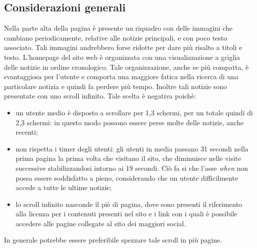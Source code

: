 \documentclass[../ProgettoTecWeb2.tex]{subfiles}
\begin{document}
	\subsection{Considerazioni generali}
		Nella parte alta della pagina è presente un riquadro con delle immagini che cambiano periodicamente, relative alle notizie principali, e con poco testo associato. Tali immagini andrebbero forse ridotte per dare più risalto a titoli e testo.
		L'homepage del sito web è organizzata con una visualizzazione a griglia delle notizie in ordine cronologico. Tale organizzazione, anche se più compatta, è svantaggiosa per l'utente e comporta una maggiore fatica nella ricerca di una particolare notizia e quindi fa perdere più tempo.
		Inoltre tali notizie sono presentate con uno scroll infinito. Tale scelta è negativa poichè:
		\begin{itemize}
			\item un utente medio è disposto a scrollare per 1,3 schermi, per un totale quindi di 2,3 schermi: in questo modo possono essere perse molte delle notizie, anche recenti;
			\item non rispetta i timer degli utenti: gli utenti in media passano 31 secondi nella prima pagina la prima volta che visitano il sito, che diminuisce nelle visite successive stabilizzandosi intorno ai 19 secondi. Ciò fa si che l'asse \textit{when} non possa essere soddisfatto a pieno, considerando che un utente difficilmente accede a tutte le ultime notizie;
			\item lo scroll infinito nasconde il piè di pagina, dove sono presenti il riferimento alla licenza per i contenuti presenti nel sito e i link con i quali è possibile accedere alle pagine collegate al sito dei maggiori social. 
		\end{itemize}
		In generale potrebbe essere preferibile spezzare tale scroll in più pagine. 
\end{document}
